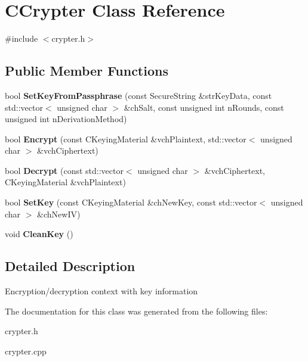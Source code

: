 \hypertarget{class_c_crypter}{}\section{C\+Crypter Class Reference}
\label{class_c_crypter}


{\ttfamily \#include $<$crypter.\+h$>$}

\subsection*{Public Member Functions}
\begin{DoxyCompactItemize}
\item 
\mbox{\label{class_c_crypter_a5368279e4a1549d3c1d15d8aa2179708}} 
bool {\bfseries Set\+Key\+From\+Passphrase} (const Secure\+String \&str\+Key\+Data, const std\+::vector$<$ unsigned char $>$ \&ch\+Salt, const unsigned int n\+Rounds, const unsigned int n\+Derivation\+Method)
\item 
\mbox{\label{class_c_crypter_a124fcd3021569a660ce2daa3391c8ea4}} 
bool {\bfseries Encrypt} (const C\+Keying\+Material \&vch\+Plaintext, std\+::vector$<$ unsigned char $>$ \&vch\+Ciphertext)
\item 
\mbox{\label{class_c_crypter_a4dbabed4975d4435d22c76deac43df7f}} 
bool {\bfseries Decrypt} (const std\+::vector$<$ unsigned char $>$ \&vch\+Ciphertext, C\+Keying\+Material \&vch\+Plaintext)
\item 
\mbox{\label{class_c_crypter_a0d948dd4796e2420e1dd9c1ddbf7974e}} 
bool {\bfseries Set\+Key} (const C\+Keying\+Material \&ch\+New\+Key, const std\+::vector$<$ unsigned char $>$ \&ch\+New\+IV)
\item 
\mbox{\label{class_c_crypter_a6910b4cff4ee40e33fbb3789dc12c139}} 
void {\bfseries Clean\+Key} ()
\end{DoxyCompactItemize}


\subsection{Detailed Description}
Encryption/decryption context with key information 

The documentation for this class was generated from the following files\+:\begin{DoxyCompactItemize}
\item 
crypter.\+h\item 
crypter.\+cpp\end{DoxyCompactItemize}
